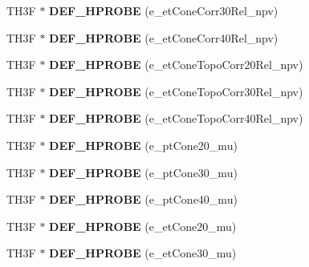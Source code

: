 \begin{DoxyCompactItemize}
\item 
\hypertarget{classHistos__Fake_a34abd882bc8564585936674c2fa85152}{
TH3F $\ast$ {\bfseries DEF\_\-HPROBE} (e\_\-etConeCorr30Rel\_\-npv)}
\label{classHistos__Fake_a34abd882bc8564585936674c2fa85152}

\item 
\hypertarget{classHistos__Fake_aebe3bc6ed2d2842e2a1c342d947a6e5f}{
TH3F $\ast$ {\bfseries DEF\_\-HPROBE} (e\_\-etConeCorr40Rel\_\-npv)}
\label{classHistos__Fake_aebe3bc6ed2d2842e2a1c342d947a6e5f}

\item 
\hypertarget{classHistos__Fake_af2bd8a6417ce56378aa70536e14cc4d6}{
TH3F $\ast$ {\bfseries DEF\_\-HPROBE} (e\_\-etConeTopoCorr20Rel\_\-npv)}
\label{classHistos__Fake_af2bd8a6417ce56378aa70536e14cc4d6}

\item 
\hypertarget{classHistos__Fake_ab571b3e59a4bbb84d9a7f352a39149a9}{
TH3F $\ast$ {\bfseries DEF\_\-HPROBE} (e\_\-etConeTopoCorr30Rel\_\-npv)}
\label{classHistos__Fake_ab571b3e59a4bbb84d9a7f352a39149a9}

\item 
\hypertarget{classHistos__Fake_ab3a3f6fd26fa0c710f984da8fd4e5cb8}{
TH3F $\ast$ {\bfseries DEF\_\-HPROBE} (e\_\-etConeTopoCorr40Rel\_\-npv)}
\label{classHistos__Fake_ab3a3f6fd26fa0c710f984da8fd4e5cb8}

\item 
\hypertarget{classHistos__Fake_a727bf654763495785a3d07bb29e25108}{
TH3F $\ast$ {\bfseries DEF\_\-HPROBE} (e\_\-ptCone20\_\-mu)}
\label{classHistos__Fake_a727bf654763495785a3d07bb29e25108}

\item 
\hypertarget{classHistos__Fake_a81210c2c9005092d9562714b25b5fcec}{
TH3F $\ast$ {\bfseries DEF\_\-HPROBE} (e\_\-ptCone30\_\-mu)}
\label{classHistos__Fake_a81210c2c9005092d9562714b25b5fcec}

\item 
\hypertarget{classHistos__Fake_a8b3a0a4b288c459b502f1f1c82594f76}{
TH3F $\ast$ {\bfseries DEF\_\-HPROBE} (e\_\-ptCone40\_\-mu)}
\label{classHistos__Fake_a8b3a0a4b288c459b502f1f1c82594f76}

\item 
\hypertarget{classHistos__Fake_a194176602ad4197d64826aaebad4014c}{
TH3F $\ast$ {\bfseries DEF\_\-HPROBE} (e\_\-etCone20\_\-mu)}
\label{classHistos__Fake_a194176602ad4197d64826aaebad4014c}

\item 
\hypertarget{classHistos__Fake_a9d1afd12047766cd5a8c41305a5cecdc}{
TH3F $\ast$ {\bfseries DEF\_\-HPROBE} (e\_\-etCone30\_\-mu)}
\label{classHistos__Fake_a9d1afd12047766cd5a8c41305a5cecdc}


\end{DoxyCompactItemize}
